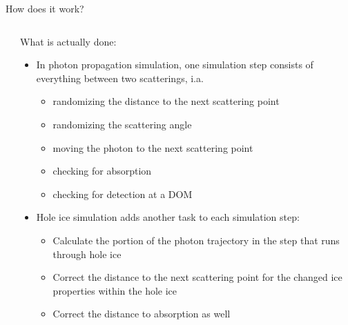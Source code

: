 
\begin{frame}[fragile]{How does it work?}

  \begin{columns}
    \begin{column}{0.5\textwidth}
    \end{column}
    \begin{column}{0.5\textwidth}

      What is actually done:

      \begin{itemize}
        \item<1> In photon propagation simulation, one simulation step consists of everything between two scatterings, i.a.
          \begin{itemize}
            \item randomizing the distance to the next scattering point
            \item randomizing the scattering angle
            \item moving the photon to the next scattering point
            \item checking for absorption
            \item checking for detection at a DOM
          \end{itemize}

        \item<2> Hole ice simulation adds another task to each simulation step:
          \begin{itemize}
            \item Calculate the portion of the photon trajectory in the step that runs through hole ice
            \item Correct the distance to the next scattering point for the changed ice properties within the hole ice
            \item Correct the distance to absorption as well
          \end{itemize}
      \end{itemize}

    \end{column}
  \end{columns}

\end{frame}